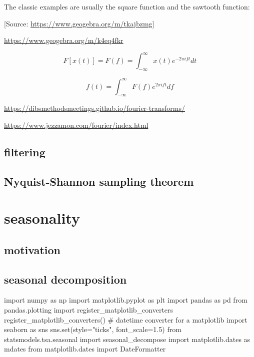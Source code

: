 \documentclass[
  letterpaper,
  DIV=11,
  numbers=noendperiod,
  oneside]{scrreprt}
\newenvironment{Shaded}{\begin{snugshade}}{\end{snugshade}}
\newcommand{\BuiltInTok}[1]{\textcolor[rgb]{0.00,0.23,0.31}{#1}}
\newcommand{\CommentTok}[1]{\textcolor[rgb]{0.37,0.37,0.37}{#1}}
\newcommand{\FloatTok}[1]{\textcolor[rgb]{0.68,0.00,0.00}{#1}}
\newcommand{\ImportTok}[1]{\textcolor[rgb]{0.00,0.46,0.62}{#1}}
\newcommand{\NormalTok}[1]{\textcolor[rgb]{0.00,0.23,0.31}{#1}}
\newcommand{\OperatorTok}[1]{\textcolor[rgb]{0.37,0.37,0.37}{#1}}
\newcommand{\StringTok}[1]{\textcolor[rgb]{0.13,0.47,0.30}{#1}}
\begin{document}
The classic examples are usually the square function and the sawtooth
function:

{[}Source: \url{https://www.geogebra.org/m/tkajbzmg}{]}

\url{https://www.geogebra.org/m/k4eq4fkr}

\[
F[x(t)] = F(f) = \int_{-\infty}^{\infty}x(t)e^{-2\pi i f t}dt
\]

\[
f(t) = \int_{-\infty}^{\infty}F(f)e^{2\pi i f t}df
\]

\url{https://dibsmethodsmeetings.github.io/fourier-transforms/}

\url{https://www.jezzamon.com/fourier/index.html}

\hypertarget{filtering}{%
\chapter{filtering}\label{filtering}}

\hypertarget{nyquist-shannon-sampling-theorem}{%
\chapter{Nyquist-Shannon sampling
theorem}\label{nyquist-shannon-sampling-theorem}}

\part{seasonality}

\hypertarget{motivation-7}{%
\chapter{motivation}\label{motivation-7}}

\hypertarget{seasonal-decomposition}{%
\chapter{seasonal decomposition}\label{seasonal-decomposition}}

\begin{Shaded}
\begin{Highlighting}[]
\ImportTok{import}\NormalTok{ numpy }\ImportTok{as}\NormalTok{ np}
\ImportTok{import}\NormalTok{ matplotlib.pyplot }\ImportTok{as}\NormalTok{ plt}
\ImportTok{import}\NormalTok{ pandas }\ImportTok{as}\NormalTok{ pd}
\ImportTok{from}\NormalTok{ pandas.plotting }\ImportTok{import}\NormalTok{ register\_matplotlib\_converters}
\NormalTok{register\_matplotlib\_converters()  }\CommentTok{\# datetime converter for a matplotlib}
\ImportTok{import}\NormalTok{ seaborn }\ImportTok{as}\NormalTok{ sns}
\NormalTok{sns.}\BuiltInTok{set}\NormalTok{(style}\OperatorTok{=}\StringTok{"ticks"}\NormalTok{, font\_scale}\OperatorTok{=}\FloatTok{1.5}\NormalTok{)}
\ImportTok{from}\NormalTok{ statsmodels.tsa.seasonal }\ImportTok{import}\NormalTok{ seasonal\_decompose}
\ImportTok{import}\NormalTok{ matplotlib.dates }\ImportTok{as}\NormalTok{ mdates}
\ImportTok{from}\NormalTok{ matplotlib.dates }\ImportTok{import}\NormalTok{ DateFormatter}
\end{Highlighting}
\end{Shaded}
\end{document}

